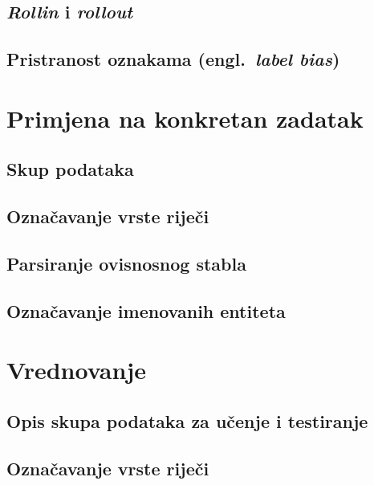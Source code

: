 \documentclass[times, utf8, diplomski]{fer}
\begin{document}
\section{\emph{Rollin} i \emph{rollout}}
\section{Pristranost oznakama (engl.~\emph{label bias})}


\chapter{Primjena na konkretan zadatak}

\section{Skup podataka}


\section{Označavanje vrste riječi}

\section{Parsiranje ovisnosnog stabla}


\section{Označavanje imenovanih entiteta}

\chapter{Vrednovanje}

\section{Opis skupa podataka za učenje i testiranje}

\section{Označavanje vrste riječi}
\end{document}
